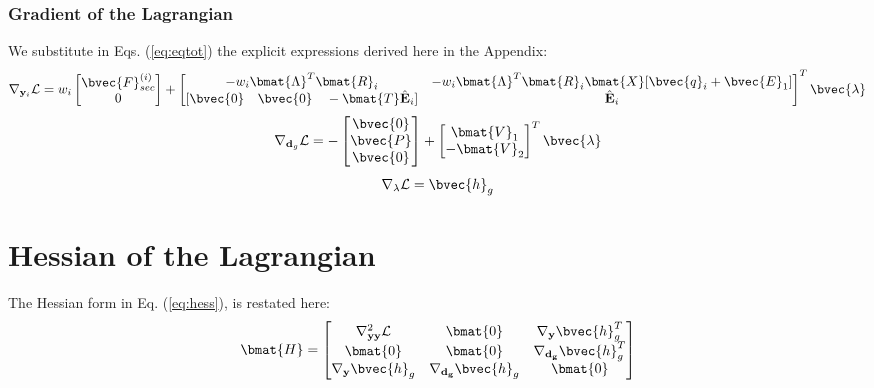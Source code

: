 \begin{appendices}
\subsection{Gradient of the Lagrangian}

We substitute in Eqs. (\ref{eq:eqtot}) the explicit expressions derived here
in the Appendix:
\begin{gather}
	\nabla_{\mathbf{y}_i}\mathcal{L} = w_i\begin{bmatrix}
		\bvec{F}_{sec}^{(i)} \\ 0
	\end{bmatrix} + \begin{bmatrix}
		-w_i\bmat{\Lambda}^T\bmat{R}_i & -w_i\bmat{\Lambda}^T
		\bmat{R}_i\bmat{X}[\bvec{q}_i+\bvec{E}_1]\\
		[\bvec{0}\quad \bvec{0}\quad -\bmat{T}\hat{\mathbf{E}}_i] & 
		\hat{\mathbf{E}}_i
	\end{bmatrix}^T\bvec{\lambda}
	\label{eq:A7}
\end{gather}
\begin{gather}
	\nabla_{\mathbf{d}_g}\mathcal{L} = -\begin{bmatrix}
		\bvec{0}\\ \bvec{P}\\ \bvec{0}	\end{bmatrix} + \begin{bmatrix}
		\bmat{V}_1 \\ -\bmat{V}_2
	\end{bmatrix}^T\bvec{\lambda}
\end{gather}
\begin{gather}
	\nabla_{\mathbf{\lambda}}\mathcal{L} = \bvec{h}_g
\end{gather}

\chapter{Hessian of the Lagrangian}\label{appendix:B}
The Hessian form in Eq. (\ref{eq:hess}), is restated here:
\begin{gather}
	\bmat{H} = 	\begin{bmatrix}
		\nabla^2_{\mathbf{yy}}\mathcal{L} & \bmat{0} & 
		\nabla_{\mathbf{y}}\bvec{h}^T_g\\
		\bmat{0} & \bmat{0} & \nabla_{\mathbf{d_g}}\bvec{h}^T_g\\
		\nabla_{\mathbf{y}}\bvec{h}_g & \nabla_{\mathbf{d_g}}\bvec{h}_g & 
		\bmat{0}\\
	\end{bmatrix}\nonumber
\end{gather}


\end{appendices}
